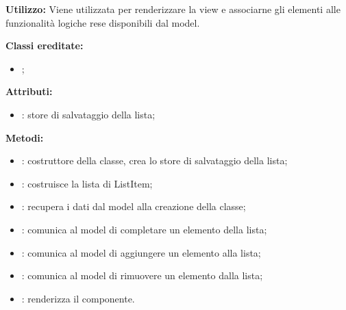 \textbf{Utilizzo:}
Viene utilizzata per renderizzare la view e associarne gli elementi alle funzionalità logiche rese disponibili dal model.

\textbf{Classi ereditate:}
\begin{itemize}
	\item {};
\end{itemize}

\textbf{Attributi:}
\begin{itemize}
	\item {}: store di salvataggio della lista;
\end{itemize}

\textbf{Metodi:}
\begin{itemize}
	\item {}: costruttore della classe, crea lo store di salvataggio della lista;
	\item {}: costruisce la lista di ListItem;
	\item {}: recupera i dati dal model alla creazione della classe;
	\item {}: comunica al model di completare un elemento della lista;
	\item {}: comunica al model di aggiungere un elemento alla lista;
	\item {}: comunica al model di rimuovere un elemento dalla lista;
	\item {}: renderizza il componente.
\end{itemize}
